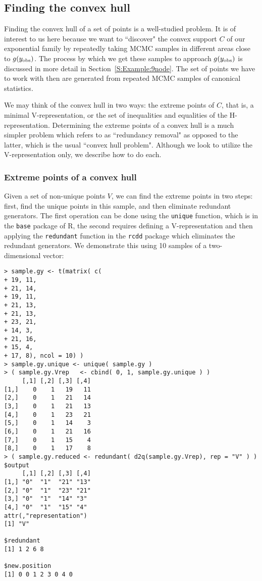 \subsection{Finding the convex hull}
Finding the convex hull of a set of points is a well-studied problem.  It 
is of interest to us here because we want to ``discover" the convex support $C$
of our exponential family by repeatedly taking MCMC samples in different 
areas close to $g(y_{\text{obs}})$.  The process by which we get these samples 
to approach $g(y_{\text{obs}})$ is discussed in more detail in Section~\ref{S:Example:9node}.  The 
set of points we have to work with then are generated from repeated MCMC
samples of canonical statistics.

We may think of the convex hull in two ways: the extreme points of $C$, that is, 
a minimal V-representation, or the set of inequalities and equalities of the 
H-representation.  Determining the extreme points of a convex hull 
is a much simpler problem which \citet{Fukuda:2004} refers to as ``redundancy 
removal" as opposed to the latter, which is the usual ``convex hull problem".
Although we look to utilize the V-representation only, we describe how to do each.

\subsubsection{Extreme points of a convex hull}
Given a set of non-unique points $V$, we can find the extreme points in two steps:
first, find the unique points in this sample, and then eliminate redundant generators.  The first operation can be done using the \texttt{unique} function, 
which is in the \texttt{base} package of R, the second requires defining a V-representation and then applying the \texttt{redundant} function in the \texttt{rcdd}
package which eliminates the redundant generators.
We demonstrate this using 10 samples of a two-dimensional vector:
\begin{singlespace}
{ \begin{verbatim}
> sample.gy <- t(matrix( c(
+ 19, 11,
+ 21, 14,
+ 19, 11,
+ 21, 13,
+ 21, 13,
+ 23, 21,
+ 14, 3,
+ 21, 16,
+ 15, 4,
+ 17, 8), ncol = 10) )
> sample.gy.unique <- unique( sample.gy ) 
> ( sample.gy.Vrep 	 <- cbind( 0, 1, sample.gy.unique ) )
     [,1] [,2] [,3] [,4]
[1,]    0    1   19   11
[2,]    0    1   21   14
[3,]    0    1   21   13
[4,]    0    1   23   21
[5,]    0    1   14    3
[6,]    0    1   21   16
[7,]    0    1   15    4
[8,]    0    1   17    8
> ( sample.gy.reduced <- redundant( d2q(sample.gy.Vrep), rep = "V" ) )
$output
     [,1] [,2] [,3] [,4]
[1,] "0"  "1"  "21" "13"
[2,] "0"  "1"  "23" "21"
[3,] "0"  "1"  "14" "3" 
[4,] "0"  "1"  "15" "4" 
attr(,"representation")
[1] "V"

$redundant
[1] 1 2 6 8

$new.position
[1] 0 0 1 2 3 0 4 0
\end{verbatim}
}
\end{singlespace}

